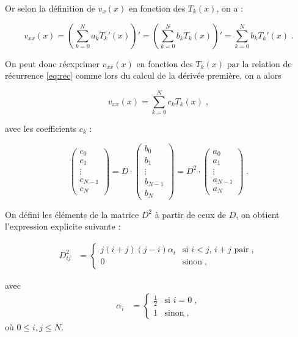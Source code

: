 \documentclass{report}
\begin{document}
Or selon la définition de $v_{x}(x)$ en fonction des $T_{k}(x)$, on a :

\begin{equation}
v_{xx}(x) = \left(\sum_{k=0}^N a_k T_{k}'(x)\right)' = \left(\sum_{k=0}^N b_k T_k(x)\right)' = \sum_{k=0}^N b_k T_{k}'(x) \;.
\end{equation}

On peut donc réexprimer $v_{xx}(x)$ en fonction des $T_{k}(x)$ par la relation de récurrence \eqref{eq:rec} comme lors du calcul de la dérivée première, on a alors 

\begin{equation}
v_{xx}(x) = \sum_{k=0}^N c_k T_k(x) \;,
\end{equation}

avec les coefficients $c_{k}$ :

\begin{equation}
\begin{pmatrix}
 c_{0}\\ 
 c_{1}\\ 
 \vdots\\ 
 c_{N-1}\\ 
 c_{N}
\end{pmatrix} 
= D \cdot \begin{pmatrix}
 b_0\\ 
 b_1\\ 
 \vdots\\ 
 b_{N-1}\\ 
 b_{N}
\end{pmatrix}
= D^2 \cdot \begin{pmatrix}
 a_0\\ 
 a_1\\ 
 \vdots\\ 
 a_{N-1}\\ 
 a_{N}
\end{pmatrix}\;.
\end{equation}

On défini les éléments de la matrice $D^2$ à partir de ceux de $D$, on obtient l'expression explicite suivante :

\begin{align}
D_{ij}^2 &= 
  \begin{cases}
    j(i+j)(j-i)\alpha_{i} & \text{si $i<j$, $i+j$ pair}\;, \\
0 & \text{sinon}\;,
  \end{cases}
  \end{align}
  
  avec 
  \begin{align}
\alpha_{i} &= 
  \begin{cases}
    \frac{1}{2} & \text{si $i =0$}\;, \\
1 & \text{sinon}\;,
  \end{cases}
  \end{align}
où $0 \leq i,j \leq N$.
\end{document}
